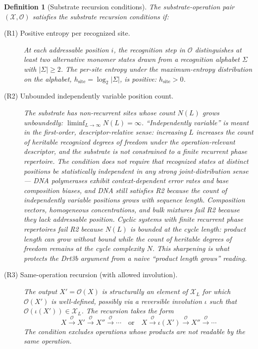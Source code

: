 \documentclass[aps,prx,reprint,amsmath,amssymb,floatfix,superscriptaddress,nofootinbib]{revtex4-2}
\theoremstyle{plain-thm}
\theoremstyle{definition-thm}
\newtheorem{definition}[theorem]{Definition}
\newcommand{\Xset}{\mathcal{X}}
\newcommand{\Op}{\mathcal{O}}
\begin{document}
\begin{definition}[Substrate recursion conditions]
\label{def:conditions}
The substrate-operation pair $(\Xset, \Op)$ satisfies the substrate recursion conditions if:

\begin{description}
\item[(R1) Positive entropy per recognized site.] At each addressable position $i$, the recognition step in $\Op$ distinguishes at least two alternative monomer states drawn from a recognition alphabet $\Sigma$ with $|\Sigma| \ge 2$. The per-site entropy under the maximum-entropy distribution on the alphabet, $h_{\mathrm{site}} = \log_2 |\Sigma|$, is positive: $h_{\mathrm{site}} > 0$.

\item[(R2) Unbounded independently variable position count.] The substrate has non-recurrent sites whose count $N(L)$ grows unboundedly: $\liminf_{L \to \infty} N(L) = \infty$. ``Independently variable'' is meant in the first-order, descriptor-relative sense: increasing $L$ increases the count of heritable recognized degrees of freedom under the operation-relevant descriptor, and the substrate is \emph{not constrained to a finite recurrent phase repertoire}. The condition does not require that recognized states at distinct positions be statistically independent in any strong joint-distribution sense --- DNA polymerases exhibit context-dependent error rates and base composition biases, and DNA still satisfies R2 because the count of independently variable positions grows with sequence length. Composition vectors, homogeneous concentrations, and bulk mixtures fail R2 because they lack addressable position. Cyclic systems with finite recurrent phase repertoires fail R2 because $N(L)$ is bounded at the cycle length: product length can grow without bound while the count of heritable degrees of freedom remains at the cycle complexity $N$. This sharpening is what protects the Drt3b argument from a naive ``product length grows'' reading.

\item[(R3) Same-operation recursion (with allowed involution).] The output $X' = \Op(X)$ is structurally an element of $\Xset_L$ for which $\Op(X')$ is well-defined, possibly via a reversible involution $\iota$ such that $\Op(\iota(X')) \in \Xset_L$. The recursion takes the form
\[
X \xrightarrow{\Op} X' \xrightarrow{\Op} X'' \xrightarrow{\Op} \cdots \quad \text{or} \quad X \xrightarrow{\Op} \iota(X') \xrightarrow{\Op} X'' \xrightarrow{\Op} \cdots
\]
The condition excludes operations whose products are not readable by the same operation.


\end{description}
\end{definition}
\end{document}
